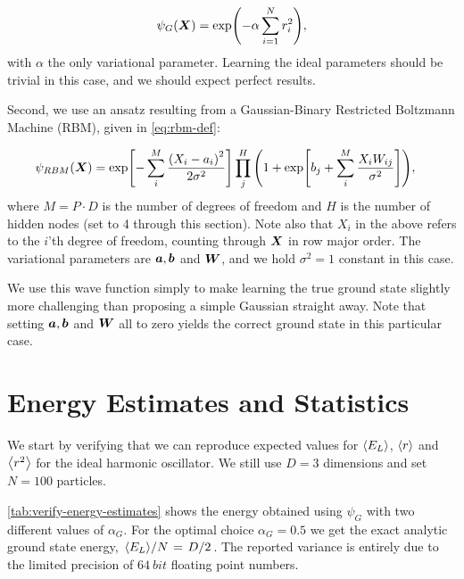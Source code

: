 \documentclass[Thesis.tex]{subfiles}
\begin{document}
\begin{align}
  \psi_G(\bm{X}) = \exp(-\alpha\sum_{i = 1}^N r_i^2),
\end{align}
with $\alpha$ the only variational parameter. Learning the ideal parameters
should be trivial in this case, and we should expect perfect results.

Second, we use an ansatz resulting from a Gaussian-Binary Restricted Boltzmann
Machine (RBM), given in \cref{eq:rbm-def}:


\begin{align}
  \psi_{RBM}(\bm{X}) &=
        \exp[-\sum_i^{M} \frac{\qty(X_i-a_i)^2}{2\sigma^2}]
        \prod_j^H \qty(1 + \exp[b_j+\sum_i^M \frac{X_iW_{ij}}{\sigma^2}]),
\end{align}
where $M = P\cdot D$ is the number of degrees of freedom and $H$ is
the number of hidden nodes (set to 4 through this section). Note also that $X_i$
in the above refers to the $i$'th degree of freedom, counting through $\bm{X}$
in row major order. The variational parameters are $\bm{a}, \bm{b}$ and $\bm{W}$,
and we hold $\sigma^2=1$ constant in this case.

We use this wave function simply to make learning the true ground state slightly
more challenging than proposing a simple Gaussian straight away. Note that
setting $\bm{a}, \bm{b}$ and $\bm{W}$ all to zero yields the correct ground state in this particular case.

\section{Energy Estimates and Statistics}

We start by verifying that we can reproduce expected values for $\expval{E_L}$,
$\expval{r}$ and $\expval{r^2}$ for the ideal harmonic oscillator. We still use
$D=3$ dimensions and set $N=100$ particles.

\cref{tab:verify-energy-estimates} shows the energy obtained using $\psi_G$ with
two different values of $\alpha_G$. For the optimal choice $\alpha_G = 0.5$ we
get the exact analytic ground state energy, $\flatfrac{\expval{E_L}}{N} =
\flatfrac{D}{2}$. The reported variance is entirely due to the limited
precision of $\SI{64}{bit}$ floating point numbers.
\end{document}
